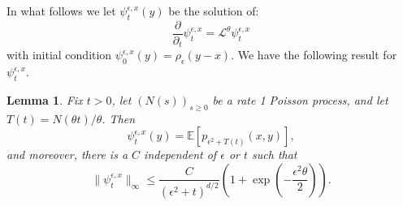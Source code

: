\documentclass[12pt]{article}
\newtheorem{lemma}[theorem]{Lemma}
\newcommand{\IE}{\mathbb E}
\begin{document}
In what follows we let $\psi_t^{\epsilon, x}(y)$ be the solution of:
\begin{equation}
    \frac{\partial}{ \partial_t} \psi_t^{\epsilon,x}
    =
    \mathcal{L}^\theta \psi_t^{\epsilon, x}
    \label{AlmostHeatEquation}
\end{equation}
with initial condition $\psi_0^{\epsilon,x}(y) = \rho_\epsilon(y-x)$.
We have the following result for $\psi_t^{\epsilon,x}$.

\begin{lemma} \label{PsiBoundHS}
    Fix $t>0$,
    let $(N(s))_{s \ge 0}$ be a rate 1 Poisson process,
    and let $T(t) = N(\theta t) / \theta$.
    Then
    \[
        \psi^{\epsilon,x}_t(y)
        =
        \IE\left[ p_{\epsilon^2+T(t)}(x,y)\right],
    \]
    and moreover, there is a $C$ independent of $\epsilon$ or $t$ such that
    \[
        \| \psi^{\epsilon,x}_t \|_\infty
        \leq
        \frac{C}{(\epsilon^2 + t)^{d/2}}
        \left(
            1 + \exp\left(-\frac{\epsilon^2 \theta}{2}\right)
        \right) .
    \]
\end{lemma}
\end{document}
